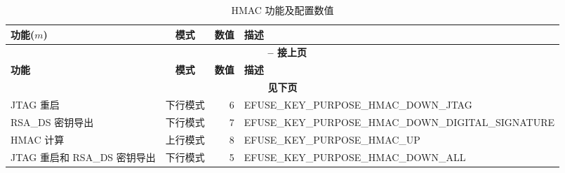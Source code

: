 \begin{longtable}[c]{|p{2cm}|c|r|p{9.5cm}|}
\caption{HMAC 功能及配置数值}
\label{tab:hmac-key-purpose}
\\    \hline
    \rowcolor{lightgray}
    \textbf{功能(\begin{math}m\end{math})} & \textbf{模式} & \textbf{数值} & \textbf{描述} \\\hline
    \endfirsthead
    
    \multicolumn{4}{c}{\bfseries \tablename\ \thetable{} -- 接上页}\\\hline
    
    \rowcolor{lightgray}
    \textbf{功能} & \textbf{模式} & \textbf{数值} & \textbf{描述} \\\hline
    \endhead
    \multicolumn{4}{c}{\textbf{见下页}}\\
    \endfoot
    \endlastfoot
    \hline
    
    JTAG 重启 & 下行模式 & 6 & EFUSE\_KEY\_PURPOSE\_HMAC\_DOWN\_JTAG \\
    \hline
    RSA\_DS 密钥导出 & 下行模式 & 7 & EFUSE\_KEY\_PURPOSE\_HMAC\_DOWN\_DIGITAL\_SIGNATURE \\
    \hline
    HMAC 计算 & 上行模式 & 8 & EFUSE\_KEY\_PURPOSE\_HMAC\_UP \\    
    \hline
    JTAG 重启和 RSA\_DS 密钥导出 & 下行模式 & 5 & EFUSE\_KEY\_PURPOSE\_HMAC\_DOWN\_ALL \\
    \hline
\end{longtable}
